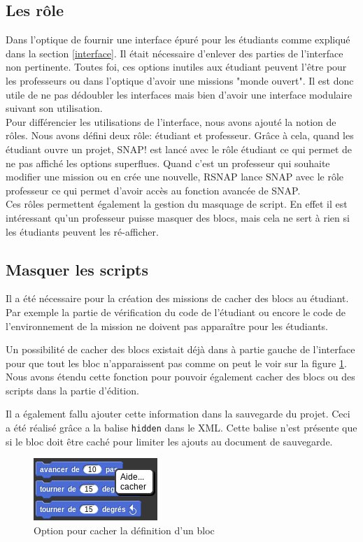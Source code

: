 \subsection{Les rôle}
\label{role}
Dans l'optique de fournir une interface épuré pour les étudiants comme expliqué dans la section \ref{interface}. Il était nécessaire d'enlever des parties de l'interface non pertinente. Toutes foi, ces options inutiles aux étudiant peuvent l'être pour les professeurs ou dans l'optique d'avoir une missions "monde ouvert". Il est donc utile de ne pas dédoubler les interfaces mais bien d'avoir une interface modulaire suivant son utilisation. \\

Pour différencier les utilisations de l'interface, nous avons ajouté la notion de rôles. Nous avons défini deux rôle: étudiant et professeur. Grâce à cela, quand les étudiant ouvre un projet, SNAP! est lancé avec le rôle étudiant ce qui permet de ne pas affiché les options superflues. Quand c'est un professeur qui souhaite modifier une mission ou en crée une nouvelle, RSNAP lance SNAP avec le rôle professeur ce qui permet d'avoir accès au fonction avancée de SNAP.\\

Ces rôles permettent également la gestion du masquage de script. En effet il est intéressant qu'un professeur puisse masquer des blocs, mais cela ne sert à rien si les étudiants peuvent les ré-afficher.

\subsection{Masquer les scripts}
Il a été nécessaire pour la création des missions de cacher des blocs au étudiant. Par exemple la partie de vérification du code de l'étudiant ou encore le code de l'environnement de la mission ne doivent pas apparaître pour les étudiants. 

Un possibilité de cacher des blocs existait déjà dans à partie gauche de l'interface pour que tout les bloc n'apparaissent pas comme on peut le voir sur la figure \ref{fig:cacher}. Nous avons étendu cette fonction pour pouvoir également cacher des blocs ou des scripts dans la partie d'édition.

Il a également fallu ajouter cette information dans la sauvegarde du projet. Ceci a été réalisé grâce a la balise \texttt{hidden} dans le XML. Cette balise n'est présente que si le bloc doit être caché pour limiter les ajouts au document de sauvegarde.
\begin{figure}[ht]
  \begin{center}
    \includegraphics[scale=0.5]{content/7-solution/2-snap/images/cacher}
    \caption{Option pour cacher la définition d'un bloc}
    \label{fig:cacher}
  \end{center}
\end{figure}

